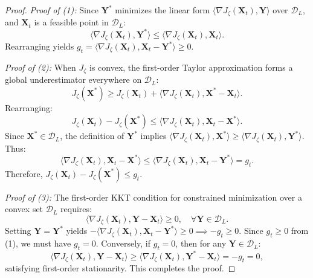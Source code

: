 \documentclass[conference]{IEEEtran}
\begin{document}
\begin{proof}
\textit{Proof of (1):} Since $\mathbf{Y}^*$ minimizes the linear form $\langle\nabla J_\zeta(\mathbf{X}_t), \mathbf{Y}\rangle$ over $\mathcal{D}_L$, and $\mathbf{X}_t$ is a feasible point in $\mathcal{D}_L$:
\begin{equation}
\langle\nabla J_\zeta(\mathbf{X}_t), \mathbf{Y}^*\rangle \leq \langle\nabla J_\zeta(\mathbf{X}_t), \mathbf{X}_t\rangle.
\end{equation}
Rearranging yields $g_t = \langle\nabla J_\zeta(\mathbf{X}_t), \mathbf{X}_t - \mathbf{Y}^*\rangle \geq 0$.

\textit{Proof of (2):} When $J_\zeta$ is convex, the first-order Taylor approximation forms a global underestimator everywhere on $\mathcal{D}_L$:
\begin{equation}
J_\zeta(\mathbf{X}^*) \geq J_\zeta(\mathbf{X}_t) + \big\langle \nabla J_\zeta(\mathbf{X}_t), \mathbf{X}^* - \mathbf{X}_t \big\rangle.
\end{equation}
Rearranging:
\begin{equation}
J_\zeta(\mathbf{X}_t) - J_\zeta(\mathbf{X}^*) \leq \big\langle \nabla J_\zeta(\mathbf{X}_t), \mathbf{X}_t - \mathbf{X}^* \big\rangle.
\end{equation}
Since $\mathbf{X}^* \in \mathcal{D}_L$, the definition of $\mathbf{Y}^*$ implies $\langle\nabla J_\zeta(\mathbf{X}_t), \mathbf{X}^*\rangle \geq \langle\nabla J_\zeta(\mathbf{X}_t), \mathbf{Y}^*\rangle$. Thus:
\begin{equation}
\big\langle \nabla J_\zeta(\mathbf{X}_t), \mathbf{X}_t - \mathbf{X}^* \big\rangle \leq \big\langle \nabla J_\zeta(\mathbf{X}_t), \mathbf{X}_t - \mathbf{Y}^* \big\rangle = g_t.
\end{equation}
Therefore, $J_\zeta(\mathbf{X}_t) - J_\zeta(\mathbf{X}^*) \leq g_t$.

\textit{Proof of (3):} The first-order KKT condition for constrained minimization over a convex set $\mathcal{D}_L$ requires:
\begin{equation}
\big\langle \nabla J_\zeta(\mathbf{X}_t), \mathbf{Y} - \mathbf{X}_t \big\rangle \geq 0, \quad \forall \mathbf{Y} \in \mathcal{D}_L.
\end{equation}
Setting $\mathbf{Y} = \mathbf{Y}^*$ yields $-\langle\nabla J_\zeta(\mathbf{X}_t), \mathbf{X}_t - \mathbf{Y}^*\rangle \geq 0 \implies -g_t \geq 0$. Since $g_t \geq 0$ from (1), we must have $g_t = 0$. Conversely, if $g_t = 0$, then for any $\mathbf{Y} \in \mathcal{D}_L$:
\begin{equation}
\langle\nabla J_\zeta(\mathbf{X}_t), \mathbf{Y} - \mathbf{X}_t\rangle \geq \langle\nabla J_\zeta(\mathbf{X}_t), \mathbf{Y}^* - \mathbf{X}_t\rangle = -g_t = 0,
\end{equation}
satisfying first-order stationarity. This completes the proof.
\end{proof}
\end{document}
